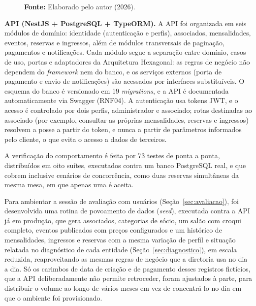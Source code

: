 \documentclass[12pt,a4paper]{article}
\begin{document}
\begin{figure}[H]
\caption*{\textbf{Fonte:} Elaborado pelo autor (2026).}
\end{figure}

\textbf{API (NestJS + PostgreSQL + TypeORM).} A API foi organizada em seis módulos de domínio:
identidade (autenticação e perfis), associados, mensalidades, eventos, reservas e ingressos,
além de módulos transversais de paginação, pagamentos e notificações. Cada módulo segue a separação
entre domínio, casos de uso, portas e adaptadores da Arquitetura Hexagonal: as regras de negócio não
dependem do \textit{framework} nem do banco, e os serviços externos (porta de pagamento e envio de
notificações) são acessados por interfaces substituíveis. O esquema do banco é versionado em 19
\textit{migrations}, e a API é documentada automaticamente via Swagger (RNF04). A autenticação usa
tokens JWT, e o acesso é controlado por dois perfis, administrador e associado; rotas destinadas ao
associado (por exemplo, consultar as próprias mensalidades, reservas e ingressos) resolvem a posse a
partir do token, e nunca a partir de parâmetros informados pelo cliente, o que evita o acesso a dados
de terceiros.

A verificação do comportamento é feita por 73 testes de ponta a ponta, distribuídos em
oito suítes, executados contra um banco PostgreSQL real, e que cobrem inclusive cenários de
concorrência, como duas reservas simultâneas da mesma mesa, em que apenas uma é aceita.

Para ambientar a sessão de avaliação com usuários (Seção~\ref{sec:avaliacao}), foi desenvolvida uma
rotina de povoamento de dados (\textit{seed}), executada contra a API já em produção, que gera
associados, categorias de sócio, um salão com croqui completo, eventos publicados com preços
configurados e um histórico de mensalidades, ingressos e reservas com a mesma variação de perfil
e situação relatada no diagnóstico de cada entidade (Seção~\ref{sec:diagnostico}), em escala
reduzida, reaproveitando as mesmas regras de negócio que a diretoria usa no dia a dia. Só os
carimbos de data de criação e de pagamento desses registros fictícios, que a API deliberadamente
não permite retroceder, foram ajustados à parte, para distribuir o volume ao longo de vários meses
em vez de concentrá-lo no dia em que o ambiente foi provisionado.
\end{document}
